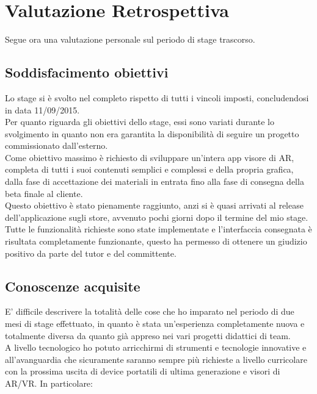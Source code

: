 \section{Valutazione Retrospettiva}
Segue ora una valutazione personale sul periodo di stage trascorso.
\subsection{Soddisfacimento obiettivi}
Lo stage si \`e svolto nel completo rispetto di tutti i vincoli imposti, concludendosi in data 11/09/2015. \\
Per quanto riguarda gli obiettivi dello stage, essi sono variati durante lo svolgimento in quanto non era garantita la disponibilit\`a di seguire un progetto commissionato dall'esterno.\\
Come obiettivo massimo è richiesto di sviluppare un’intera app visore di AR, completa di tutti i suoi contenuti semplici e complessi e della propria grafica, dalla fase di accettazione dei materiali in entrata fino alla fase di consegna della beta finale al cliente.\\
Questo obiettivo \`e stato pienamente raggiunto, anzi si \`e quasi arrivati al release dell'applicazione sugli store, avvenuto pochi giorni dopo il termine del mio stage.\\
Tutte le funzionalit\`a richieste sono state implementate e l’interfaccia consegnata \`e risultata completamente funzionante, questo ha permesso di ottenere un giudizio positivo da parte del tutor e del committente.\\

\subsection{Conoscenze acquisite}
E' difficile descrivere la totalit\`a delle cose che ho imparato nel periodo di due mesi di stage effettuato, in quanto \`e stata un'esperienza completamente nuova e totalmente diversa da quanto gi\`a appreso nei vari progetti didattici di team.\\
A livello tecnologico ho potuto arricchirmi di strumenti e tecnologie innovative e all'avanguardia che sicuramente saranno sempre pi\`u richieste a livello curricolare con la prossima uscita di device portatili di ultima generazione e visori di AR/VR. In particolare:

